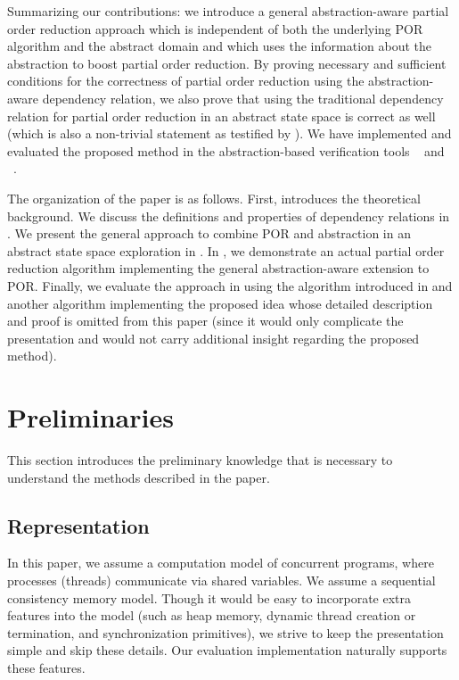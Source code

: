 \documentclass[numbook]{svjour3}
\begin{document}
Summarizing our contributions: we introduce a general abstraction-aware partial order reduction approach which is independent of both the underlying POR algorithm and the abstract domain and which uses the information about the abstraction to boost partial order reduction. By proving necessary and sufficient conditions for the correctness of partial order reduction using the abstraction-aware dependency relation, we also prove that using the traditional dependency relation for partial order reduction in an abstract state space is correct as well (which is also a non-trivial statement as testified by ). We have implemented and evaluated the proposed method in the abstraction-based verification tools \Th~\cite{theta} and \CPA~\cite{cpachecker}.

The organization of the paper is as follows. First,  introduces the theoretical background. We discuss the definitions and properties of dependency relations in . We present the general approach to combine POR and abstraction in an abstract state space exploration in . In , we demonstrate an actual partial order reduction algorithm implementing the general abstraction-aware extension to POR. Finally, we evaluate the approach in  using the algorithm introduced in  and another algorithm implementing the proposed idea whose detailed description and proof is omitted from this paper (since it would only complicate the presentation and would not carry additional insight regarding the proposed method).


\section{Preliminaries}
\label{sec:por-preliminaries}

This section introduces the preliminary knowledge that is necessary to understand the methods described in the paper.

\subsection{Representation}

In this paper, we assume a computation model of concurrent programs, where processes (threads) communicate via shared variables. We assume a sequential consistency memory model. Though it would be easy to incorporate extra features into the model (such as heap memory, dynamic thread creation or termination, and synchronization primitives), we strive to keep the presentation simple and skip these details. Our evaluation implementation naturally supports these features.
\end{document}
